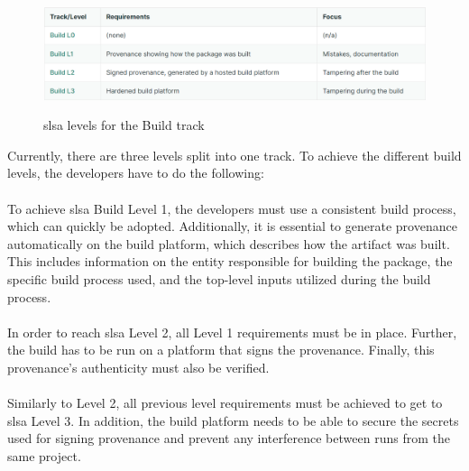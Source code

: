 \vspace{2mm}
\begin{figure}[H]
    \centering
    \includegraphics[width=0.8\columnwidth]{Images/slsalevels.png}
    \caption{\acrshort{slsa} levels for the Build track}\cite{SLSAlevels}
    \label{fig: SLSA levels for the Build track}
\end{figure}
Currently, there are three levels split into one track. To achieve the different build levels, the developers have to do the following:
\\~\\
To achieve \acrshort{slsa} Build Level 1, the developers must use a consistent build process, which can quickly be adopted. Additionally, it is essential to generate \gls{provenance} automatically on the build platform, which describes how the artifact was built. This includes information on the entity responsible for building the package, the specific build process used, and the top-level inputs utilized during the build process.
\\~\\
In order to reach \acrshort{slsa} Level 2, all Level 1 requirements must be in place. Further, the build has to be run on a platform that signs the \gls{provenance}. Finally, this \gls{provenance}'s authenticity must also be verified.
\\~\\
Similarly to Level 2, all previous level requirements must be achieved to get to \acrshort{slsa} Level 3. In addition, the build platform needs to be able to secure the secrets used for signing \gls{provenance} and prevent any interference between runs from the same project.  


